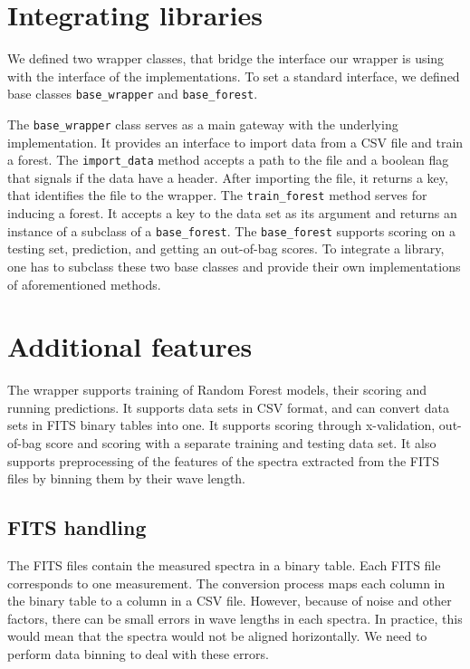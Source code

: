 \documentclass[thesis=B,english]{FITthesis}[2012/10/20]
\begin{document}
\section{Integrating libraries}
We defined two wrapper classes, that bridge the interface our wrapper is using with the interface of the implementations. To set a standard interface, we defined base classes \texttt{base\_wrapper} and \texttt{base\_forest}. 

The \texttt{base\_wrapper} class serves as a main gateway with the underlying implementation. It provides an interface to import data from a CSV file and train a forest. The \texttt{import\_data} method accepts a path to the file and a boolean flag that signals if the data have a header. After importing the file, it returns a key, that identifies the file to the wrapper. The \texttt{train\_forest} method serves for inducing a forest. It accepts a key to the data set as its argument and returns an instance of a subclass of a \texttt{base\_forest}. The \texttt{base\_forest} supports scoring on a testing set, prediction, and getting an out-of-bag scores. To integrate a library, one has to subclass these two base classes and provide their own implementations of aforementioned methods.

\section{Additional features}
The wrapper supports training of Random Forest models, their scoring and running predictions. It supports data sets in CSV format, and can convert data sets in FITS binary tables into one. It supports scoring through x-validation, out-of-bag score and scoring with a separate training and testing data set. It also supports preprocessing of the features of the spectra extracted from the FITS files by binning them by their wave length.

\subsection{FITS handling}
The FITS files contain the measured spectra in a binary table. Each FITS file corresponds to one measurement. The conversion process maps each column in the binary table to a column in a CSV file. However, because of noise and other factors, there can be small errors in wave lengths in each spectra. In practice, this would mean that the spectra would not be aligned horizontally. We need to perform data binning to deal with these errors. 
\end{document}
